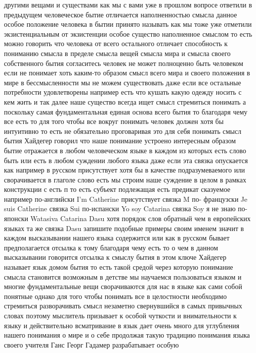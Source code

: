 другими вещами и существами как мы с вами уже в прошлом вопросе ответили в
предыдущем человеческое бытие отличается наполненностью смысла данное особое
положение человека в бытии принято называть как мы тоже уже отметили
экзистенциальным от экзистенции особое существо наполненное смыслом то есть
можно говорить что человека от всего остального отличает способность к пониманию
смысла в пределе смысла вещей смысла мира и смысла своего собственного бытия
согласитесь человек не может полноценно быть человеком если не понимает хоть
каким-то образом смысл всего мира и своего положения в мире в бессмысленности мы
не можем существовать даже если все остальные потребности удовлетворены например
есть что кушать какую одежду носить с кем жить и так далее наше существо всегда
ищет смысл стремиться понимать а поскольку самая фундаментальная единая основа
всего бытия то благодаря чему все есть то для того чтобы все вокруг понимать
человек должен хотя бы интуитивно то есть не обязательно проговаривая это для
себя понимать смысл бытия Хайдегер говорил что наше понимание устроено
интересным образом бытие отражается в любом человеческом языке в каждом из
которых есть слово быть или есть в любом суждении любого языка даже если эта
связка опускается как например в русском присутствует хотя бы в качестве
подразумеваемого или сворачивается в глаголе слово есть мы строим наше суждение
в целом в рамках конструкции с есть п то есть субъект подлежащая есть предикат
сказуемое например по-английски I'm Catherine присутствует связка M по-
французски Je suis Catherine связка Sui по-испански Yo soy Catarina связка Soy я
не знаю по-японски Watasiva Catarina Dasu хотя порядок слов обратный чем в
европейских языках та же связка Dasu запишите подобные примеры своим именем
значит в каждом высказывании нашего языка содержится или как в русском бывает
предполагается отсылка к тому благодаря чему есть то о чем в данном высказывании
говорится отсылка к смыслу бытия в этом ключе Хайдегер называет язык домом бытия
то есть такой средой через которую понимание смысла становится возможным в
детстве мы научаемся пользоваться языком и многие фундаментальные вещи
сворачиваются для нас в языке как сами собой понятные однако для того чтобы
понимать все в целостности необходимо стремиться разворачивать смысл незаметно
свернувшийся в самых привычных словах поэтому мыслитель призывает к особой
чуткости и внимательности к языку и действительно всматривание в язык дает очень
много для углубления нашего понимания о мире и о себе продолжая такую традицию
понимания языка своего учителя Ганс Георг Гадамер разрабатывает особую
